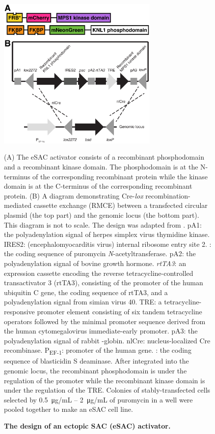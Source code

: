 \begin{figure}
    \centering
    \includegraphics[width=0.7\textwidth]{chapters/figures/eSAC+Cre-lox.pdf}
    \caption{\textbf{The design of an ectopic SAC (eSAC) activator.}}
    \noindent\justifying (A) The eSAC activator consists of a recombinant  phosphodomain and a recombinant  kinase domain. The phosphodomain is at the N-terminus of the corresponding recombinant protein while the kinase domain is at the C-terminus of the corresponding recombinant protein. (B) A diagram demonstrating Cre-\textit{lox} recombination-mediated cassette exchange (RMCE) between a transfected circular plasmid (the top part) and the genomic locus (the bottom part). This diagram is not to scale. The design was adapted from \cite{HeLa-A12_Khandelia2011, HeLa-A12_Ballister2014}. pA1: the polyadenylation signal of herpes simplex virus thymidine kinase. IRES2: (encephalomyocarditis virus) internal ribosome entry site 2. : the coding sequence of puromycin \textit{N}-acetyltransferase. pA2: the polyadenylation signal of bovine growth hormone. \textit{rtTA3}: an expression cassette encoding the reverse tetracycline-controlled transactivator 3 (rtTA3), consisting of the promoter of the human ubiquitin C gene, the coding sequence of rtTA3, and a polyadenylation signal from simian virus 40. TRE: a tetracycline-responsive promoter element consisting of six tandem tetracycline operators followed by the minimal promoter sequence derived from the human cytomegalovirus immediate-early promoter. pA3: the polyadenylation signal of rabbit \textbeta{}-globin. nlCre: nucleus-localized Cre recombinase. P\textsubscript{EF-1\textalpha{}}: promoter of the human  gene. : the coding sequence of blasticidin S deaminase. After integrated into the genomic locus, the recombinant phosphodomain is under the regulation of the  promoter while the recombinant kinase domain is under the regulation of the TRE. Colonies of stably-transfected cells selected by \SI{0.5}{\micro g/mL} -- \SI{2}{\micro g/mL} of puromycin in a well were pooled together to make an eSAC cell line.
    \label{eSAC+Cre-lox}
\end{figure}

